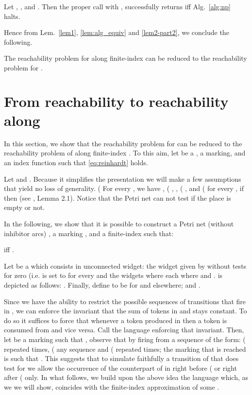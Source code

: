 \documentclass{fsttcs}
\begin{document}
\begin{lemma}
\label{lem2-part2}
Let , , and
. Then the proper call  with 
, 
successfully returns if{}f Alg.~\ref{alg:np} halts.
\end{lemma}
Hence from Lem.~\ref{lem1}, \ref{lem:alg_equiv} and \ref{lem2-part2}, we conclude the following.
\begin{corollary}
The reachability problem for
 along finite-index   can be reduced to the reachability problem for . 
\end{corollary}
 \section{From  reachability to   reachability along }\label{sec:reduc_faouzi}

In this section, we show that the reachability problem for  can be
reduced to the reachability problem of  along finite-index . To
this aim, let  be a ,  a marking,  and  an
index function such that \eqref{eq:reinhardt} holds.



Let    and .  Because it
simplifies the presentation we will make a few assumptions that yield no loss
of generality.  ( For every , we have , ( ,   ,
( , and ( for every , if  then
 (see \cite{Reinhardt}, Lemma 2.1).  Notice that the Petri net 
can not test if the place  is empty or not.



In the following, we show that it is possible to construct a Petri net (without
inhibitor arcs)  , a marking
, and a finite-index   such that:

if{}f
.


\smallskip {} 
Let  be a  which consists
in  unconnected  widget:
the widget  given by  without tests for zero (i.e.  is set to  for every  and the widgets  where each
 where
 and
. 
{ is depicted as follows:
.}
Finally, define  to be 
 for  and  elsewhere;
and .

{
Since we have the ability to restrict the possible sequences of transitions
that fire in , we can enforce the invariant that the sum of tokens in
 and  stays constant.  To do so it suffices to force that
whenever a token produced in  then a token is consumed from  and
vice versa. Call  the language enforcing that invariant. Then, let
 be a marking such that , observe that by
firing from  a sequence of the form: (  repeated  times, (
any sequence  and (  repeated  times; the marking
 that is reached is such that . This
suggests that to simulate faithfully a transition  of  that does
test  for  we allow the occurrence of the counterpart of  in
 right before ( or right after ( only. In what follows, we build
upon the above idea the language  which, as we we will show, coincides
with the finite-index approximation of some .
}
\end{document}

